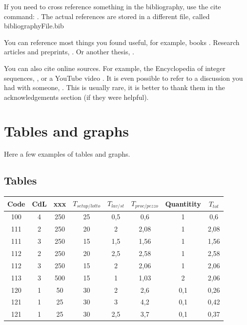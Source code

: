If you need to cross reference something in the bibliography, use the cite command: \cite[p. 45]{Biggs2002}. 
The actual references are stored in a different file, called bibliographyFile.bib 

You can reference most things you found useful,
for example, books \cite{Biggs2002,Knuth1998ArtOfProgramming,LascouxPolynomialsBook}.
Research articles and preprints, \cite{AlexanderssonSulzgruber2019,Sherman2015x}.
Or another thesis, \cite{Teff2013}.

You can also cite online sources. For example, the Encyclopedia of integer sequences, \cite{OEIS},
or a YouTube video \cite{Bazett2018yt}. 
It is even possible to refer to a discussion you had with someone, \cite{PrivateCommunicationWithJustin}.
This is usually rare, it is better to thank them in the acknowledgements section (if they were helpful).



\clearpage{\thispagestyle{empty}\cleardoublepage}
\section{Tables and graphs}
\label{sec:tables-and-graphs}
Here a few examples of tables and graphs.
\subsection{Tables}
\label{ssec:tables}
\begin{center}
\begin{tabular}{c c c c c c c c}
\arrayrulecolor{Azzurro}
\hline
{\bfseries Code} & {\bfseries CdL} & {\bfseries xxx} & {\bfseries $T_{setup/lotto}$} & {\bfseries $T_{lav/st}$} & {\bfseries $T_{proc/pezzo}$} & {\bfseries Quantitity} & {\bfseries $T_{tot}$}\\
\hline
100 & 4 & 250 & 25 & 0,5 & 0,6 & 1 & 0,6\\
111 & 2 & 250 & 20 & 2 & 2,08 & 1 & 2,08 \\
111 & 3 & 250 & 15 & 1,5 & 1,56 & 1 & 1,56 \\
112 & 2 & 250 & 20 & 2,5 & 2,58 & 1 & 2,58 \\
112 & 3 & 250 & 15 & 2 & 2,06 & 1 & 2,06\\
113 & 3 & 500 & 15 & 1 & 1,03 & 2 & 2,06\\
120 & 1 & 50 & 30 & 2 & 2,6 & 0,1 & 0,26\\
121 & 1 & 25 & 30 & 3 & 4,2 & 0,1 & 0,42 \\
121 & 1 & 25 & 30 & 2,5 & 3,7 & 0,1 & 0,37 \\
\hline
\end{tabular}
\end{center}




